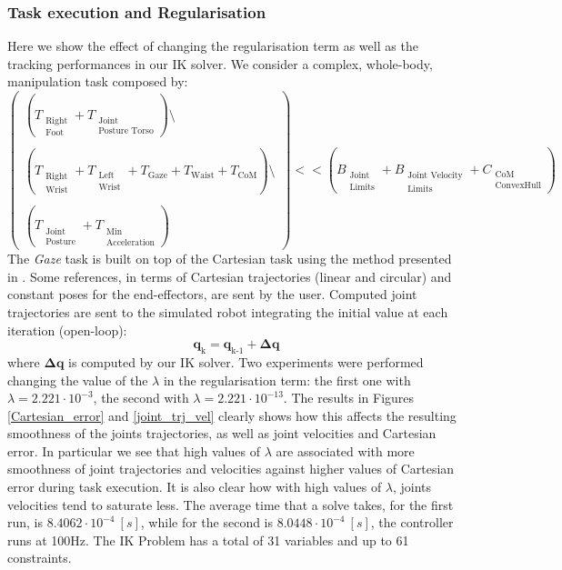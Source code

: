 \subsubsection{Task execution and Regularisation}
Here we show the effect of changing the regularisation term as well as  the tracking performances in our IK solver. We consider a complex, whole-body, manipulation task composed by:
\begin{equation}
\begin{pmatrix}
\left(T_{\substack{\text{Right}\\\text{Foot}}} + T_{\substack{\text{Joint}\\\text{Posture Torso}}}\right)\setminus\\
\\
\left(T_{\substack{\text{Right}\\\text{Wrist}}} + T_{\substack{\text{Left}\\\text{Wrist}}} + T_\text{Gaze} + T_\text{Waist} + T_\text{CoM}\right)\setminus\\ 
\\
\left(T_{\substack{\text{Joint}\\\text{Posture}}} + T_{\substack{\text{Min}\\\text{Acceleration}}}\right)
\end{pmatrix}
<< \left(B_{\substack{\text{Joint}\\\text{Limits}}} + B_{\substack{\text{Joint Velocity}\\\text{Limits}}} + C_{\substack{\text{CoM}\\\text{ConvexHull}}}\right)
\end{equation}
The \emph{Gaze} task is built on top of the Cartesian task using the method presented in \cite{milighetti:2011}.
Some references, in terms of Cartesian trajectories (linear and circular) and constant poses for the end-effectors, are sent by the user. Computed joint trajectories are sent to the simulated robot integrating the initial value at each iteration (open-loop):
\begin{equation}
    \mathbf{q}_\text{k} = \mathbf{q}_\text{k-1} + \mathbf{\Delta q}
    \label{open_loop}
\end{equation}
where $\mathbf{\Delta q}$ is computed by our IK solver. Two experiments were performed changing the value of the $\lambda$ in the regularisation term: the first one with $\lambda = 2.221\cdot10^{-3}$, the second with $\lambda = 2.221\cdot10^{-13}$. The results in Figures \ref{Cartesian_error} and \ref{joint_trj_vel} clearly shows how this affects the resulting smoothness of the joints trajectories, as well as joint velocities and Cartesian error. In particular we see that high values of $\lambda$ are associated with more smoothness of joint trajectories and velocities against higher values of Cartesian error during task execution. It is also clear how with high values of $\lambda$, joints velocities tend to saturate less. The average time that a solve takes, for the first run, is $8.4062 \cdot 10^{-4} \ [s]$, while for the second is $8.0448 \cdot 10^{-4} \ [s]$, the controller runs at 100Hz. The IK Problem has a total of 31 variables and up to 61 constraints.
